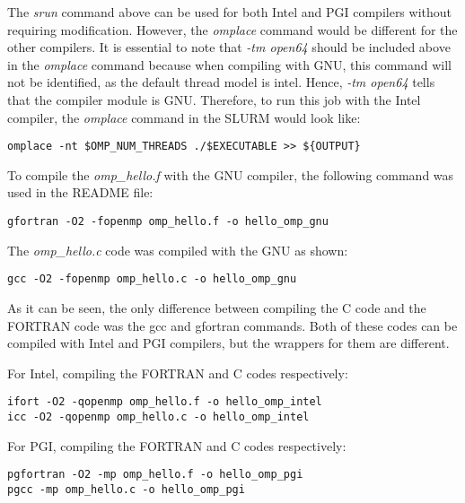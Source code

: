 The \emph{srun} command above can be used for both Intel and PGI compilers without requiring modification. However, the \emph{omplace} command would be 
different for the other compilers. It is essential to note that \emph{-tm open64} should be included above in the \emph{omplace} command because when 
compiling with GNU, this command will not be identified, as the default thread model is intel. Hence, \emph{-tm open64} tells that the compiler module is GNU. Therefore, to run this job
with the Intel compiler, the \emph{omplace} command in the SLURM would look like:

\begin{tcolorbox}
\begin{Verbatim}[fontsize=\scriptsize]
omplace -nt $OMP_NUM_THREADS ./$EXECUTABLE >> ${OUTPUT}
\end{Verbatim}
\end{tcolorbox}

To compile the \emph{omp\_hello.f} with the GNU compiler, the following command was used in the README file:

\begin{tcolorbox}
\begin{Verbatim}[fontsize=\scriptsize]
gfortran -O2 -fopenmp omp_hello.f -o hello_omp_gnu
\end{Verbatim}
\end{tcolorbox}

The \emph{omp\_hello.c} code was compiled with the GNU as shown:

\begin{tcolorbox}
\begin{Verbatim}[fontsize=\scriptsize]
gcc -O2 -fopenmp omp_hello.c -o hello_omp_gnu
\end{Verbatim}
\end{tcolorbox}

As it can be seen, the only difference between compiling the C code and the FORTRAN code was the gcc and gfortran commands. Both of these codes can be 
compiled with Intel and PGI compilers, but the wrappers for them are different.

For Intel, compiling the FORTRAN and C codes respectively:

\begin{tcolorbox}
\begin{Verbatim}[fontsize=\scriptsize]
ifort -O2 -qopenmp omp_hello.f -o hello_omp_intel
icc -O2 -qopenmp omp_hello.c -o hello_omp_intel
\end{Verbatim}
\end{tcolorbox}

For PGI, compiling the FORTRAN and C codes respectively:

\begin{tcolorbox}
\begin{Verbatim}[fontsize=\scriptsize]
pgfortran -O2 -mp omp_hello.f -o hello_omp_pgi
pgcc -mp omp_hello.c -o hello_omp_pgi
\end{Verbatim}
\end{tcolorbox}
